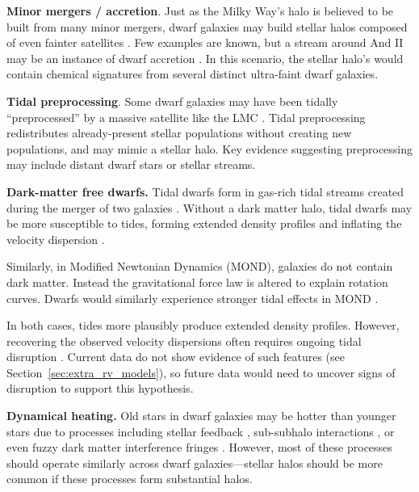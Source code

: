 \textbf{Minor mergers / accretion}. Just as the Milky Way's halo is
believed to be built from many minor mergers, dwarf galaxies may build
stellar halos composed of even fainter satellites
\citep{ricotti+polisensky+cleland2022}. Few examples are known, but a
stream around And II may be an instance of dwarf accretion
\citep{amorisco+evans+vandeven2014, roederer+2023}. In this scenario,
the stellar halo's would contain chemical signatures from several
distinct ultra-faint dwarf galaxies.

\textbf{Tidal preprocessing}. Some dwarf galaxies may have been tidally
``preprocessed'' by a massive satellite like the LMC
\citep[e.g.,][]{santistevan+2023, riley+2024}. Tidal preprocessing
redistributes already-present stellar populations without creating new
populations, and may mimic a stellar halo. Key evidence suggesting
preprocessing may include distant dwarf stars or stellar streams.

\textbf{Dark-matter free dwarfs.} Tidal dwarfs form in gas-rich tidal
streams created during the merger of two galaxies
\citep[e.g.,][]{mirabel+dottori+lutz1992, bournaud+duc2006}. Without a
dark matter halo, tidal dwarfs may be more susceptible to tides, forming
extended density profiles and inflating the velocity dispersion
\citep{casas+2012, yang+2014, wang+2024a}.

Similarly, in Modified Newtonian Dynamics (MOND), galaxies do not
contain dark matter. Instead the gravitational force law is altered to
explain rotation curves. Dwarfs would similarly experience stronger
tidal effects in MOND \citep{mcgaugh+wolf2010, brada+milgrom2000}.

In both cases, tides more plausibly produce extended density profiles.
However, recovering the observed velocity dispersions often requires
ongoing tidal disruption
\citetext{\citealp{mcgaugh+wolf2010}; \citealp[but see
also][]{sanchez-salcedo+hernandez2007}}. Current data do not show
evidence of such features (see Section~\ref{sec:extra_rv_models}), so
future data would need to uncover signs of disruption to support this
hypothesis.

\textbf{Dynamical heating.} Old stars in dwarf galaxies may be hotter
than younger stars due to processes including stellar feedback
\citep{stinson+2009, maxwell+2012, el-badry+2016, mercado+2021},
sub-subhalo interactions \citep{penarrubia+2025}, or even fuzzy dark
matter interference fringes
\citep[e.g.,][]{el-zant+2020, duttachowdhury+2023}. However, most of
these processes should operate similarly across dwarf galaxies---stellar
halos should be more common if these processes form substantial halos.

